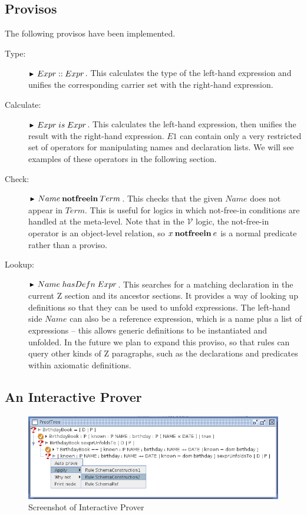 \documentclass{entcs}
\newcommand{\V}{\mathcal{V}}
\newcommand{\hasDefn}{\mathrel{hasDefn}}
\newcommand{\is}{\mathrel{is}}
\begin{document}
\subsection{Provisos}

The following provisos have been implemented.

\begin{description}
\item[Type:] $\proviso Expr :: Expr$.  This calculates the type of the
  left-hand expression and unifies the corresponding carrier set with
  the right-hand expression.

\item[Calculate:] $\proviso Expr \is Expr$.  This calculates the
  left-hand expression, then unifies the result with the right-hand
  expression.  $E1$ can contain only a very restricted set of
  operators for manipulating names and declaration lists.  We will see
  examples of these operators in the following section.

\item[Check:] $\proviso Name \notfreein Term$.  This checks that the
  given $Name$ does not appear in $Term$.  This is useful for logics
  in which not-free-in conditions are handled at the meta-level.  Note
  that in the $\V$ logic, the not-free-in operator is an object-level
  relation, so $x \mathbin{\mathop{\mathstrut{\mbox{\textbf{notfreein}}}}\nolimits} e$ is a normal predicate rather than a
  proviso.

\item[Lookup:] $\proviso Name \hasDefn Expr$.  This searches for a
  matching declaration in the current Z section and its ancestor
  sections.  It provides a way of looking up definitions so that they
  can be used to unfold expressions.  The left-hand side $Name$ can
  also be a reference expression, which is a name plus a list of
  expressions -- this allows generic definitions to be instantiated
  and unfolded.  In the future we plan to expand this proviso, so that
  rules can query other kinds of Z paragraphs, such as the
  declarations and predicates within axiomatic definitions.
\end{description}


\subsection{An Interactive Prover}

\begin{figure}[htbp]
  \centering
  \includegraphics[width=\textwidth]{cztprover1}
  \caption{Screenshot of Interactive Prover}
  \label{fig:cztprover}
\end{figure}
\end{document}
